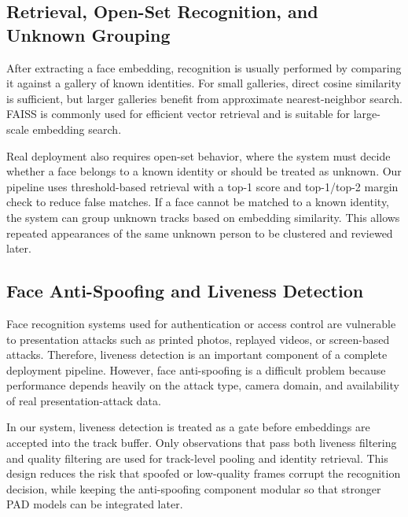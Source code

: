 \subsection{Retrieval, Open-Set Recognition, and Unknown Grouping}

After extracting a face embedding, recognition is usually performed by comparing it against a gallery of known identities. For small galleries, direct cosine similarity is sufficient, but larger galleries benefit from approximate nearest-neighbor search. FAISS is commonly used for efficient vector retrieval and is suitable for large-scale embedding search\cite{faiss}.

Real deployment also requires open-set behavior, where the system must decide whether a face belongs to a known identity or should be treated as unknown. Our pipeline uses threshold-based retrieval with a top-1 score and top-1/top-2 margin check to reduce false matches. If a face cannot be matched to a known identity, the system can group unknown tracks based on embedding similarity. This allows repeated appearances of the same unknown person to be clustered and reviewed later.

\subsection{Face Anti-Spoofing and Liveness Detection}

Face recognition systems used for authentication or access control are vulnerable to presentation attacks such as printed photos, replayed videos, or screen-based attacks. Therefore, liveness detection is an important component of a complete deployment pipeline. However, face anti-spoofing is a difficult problem because performance depends heavily on the attack type, camera domain, and availability of real presentation-attack data.

In our system, liveness detection is treated as a gate before embeddings are accepted into the track buffer. Only observations that pass both liveness filtering and quality filtering are used for track-level pooling and identity retrieval. This design reduces the risk that spoofed or low-quality frames corrupt the recognition decision, while keeping the anti-spoofing component modular so that stronger PAD models can be integrated later\cite{ming2020surveyantispoofingmethodsface}.